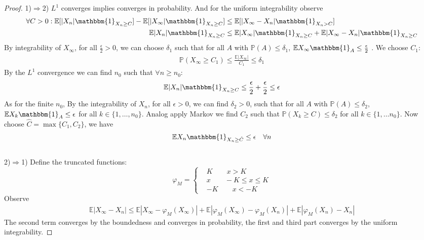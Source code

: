 \begin{proof} 
	1)$\Rightarrow$2) $L^1$ converges implies converges in probability. And for the uniform integrability observe
	\begin{align*}
		\forall C > 0: \mathbb{E}[|X_n|\mathbbm{1}_{X_n \geq C}] - \mathbb{E}[|X_\infty| \mathbbm{1}_{X_n \geq C}] 
		&\leq \mathbb{E}[|X_\infty - X_n|\mathbbm{1}_{X_n > C}]\\
		\mathbb{E}|X_n| \mathbbm{1}_{X_n \ge C} &\le \mathbb{E}|X_\infty| \mathbbm{1}_{X_n \ge C} + \mathbb{E}|X_\infty - X_n|\mathbbm{1}_{X_n \ge C}
	\end{align*}
	By integrability of $X_\infty$, for all $\frac{\epsilon}{2} > 0$, we can choose $\delta_1$ such that for all $A$ with $\mathbb{P}(A) \le \delta_1$, $\mathbb{E}X_\infty\mathbbm{1}_{A} \le \frac{\epsilon}{2}$  
. We choose $C_1$:
\begin{align*}
	\mathbb{P}(X_\infty \ge C_1) \le \frac{\mathbb{E}|X_\infty|}{C_1} \le \delta_1
\end{align*}	
By the $L^1$ convergence we can find $n_0$ such that $\forall n \ge n_0$:
\begin{align*}
	\mathbb{E}|X_n|\mathbbm{1}_{X_n \ge C} \le \frac{\epsilon}{2} + \frac{\epsilon}{2} \le \epsilon
\end{align*} 
As for the finite $n_0$, By the integrability of $X_n$, for all $\epsilon >0$, we can find $\delta_2>0$, such that for all $A$ with $\mathbb{P}(A) \le \delta_2$, $\mathbb{E}X_k \mathbbm{1}_{A} \le \epsilon$ for all $k \in \{1, \dots, n_0\}$. Analog apply Markov we find $C_2$ such that $\mathbb{P}(X_k \ge C) \le \delta_2$ for all $k \in \{1, \dots n_0\}$. Now choose $\hat{C} = \max\{C_1, C_2\}$, we have
\begin{align*}
	\mathbb{E}X_n \mathbbm{1}_{X_n \ge \hat{C}} \le \epsilon \quad \forall n
\end{align*}
	\\2)$\Rightarrow$1)
	Define the truncated functions:
\begin{equation*}
	\varphi_M = \left\{
	\begin{aligned}
		&K \qquad x > K\\
		&x \qquad -K \le x \le K\\
		&-K \qquad x < -K
	\end{aligned}	
	\right.
	\end{equation*}
Observe
	\begin{align*}
		\mathbb{E}|X_\infty - X_n| \leq \mathbb{E}|X_\infty - \varphi_M(X_\infty)| + \mathbb{E}|\varphi_M(X_\infty) - \varphi_M(X_n)| + \mathbb{E}|\varphi_M(X_n) - X_n|
	\end{align*}
	The second term converges by the boundedness and converges in probability, the first and third part converges by the uniform integrability.
\end{proof}

